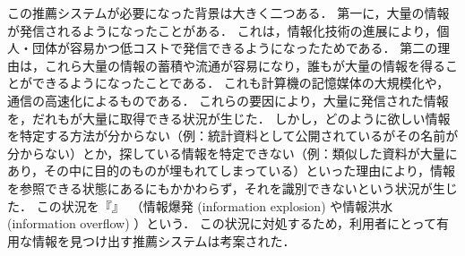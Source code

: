 この推薦システムが必要になった背景は大きく二つある．
第一に，大量の情報が発信されるようになったことがある．
これは，情報化技術の進展により，個人・団体が容易かつ低コストで発信できるようになったためである．
第二の理由は，これら大量の情報の蓄積や流通が容易になり，誰もが大量の情報を得ることができるようになったことである．
これも計算機の記憶媒体の大規模化や，通信の高速化によるものである．
これらの要因により，大量に発信された情報を，だれもが大量に取得できる状況が生じた．
しかし，どのように欲しい情報を特定する方法が分からない（例：統計資料として公開されているがその名前が分からない）とか，探している情報を特定できない（例：類似した資料が大量にあり，その中に目的のものが埋もれてしまっている）といった理由により，情報を参照できる状態にあるにもかかわらず，それを識別できないという状況が生じた．
この状況を『』~\cite{misc:009}（情報爆発 (information explosion) や情報洪水 (information overflow) ）という．
この状況に対処するため，利用者にとって有用な情報を見つけ出す推薦システムは考案された．

